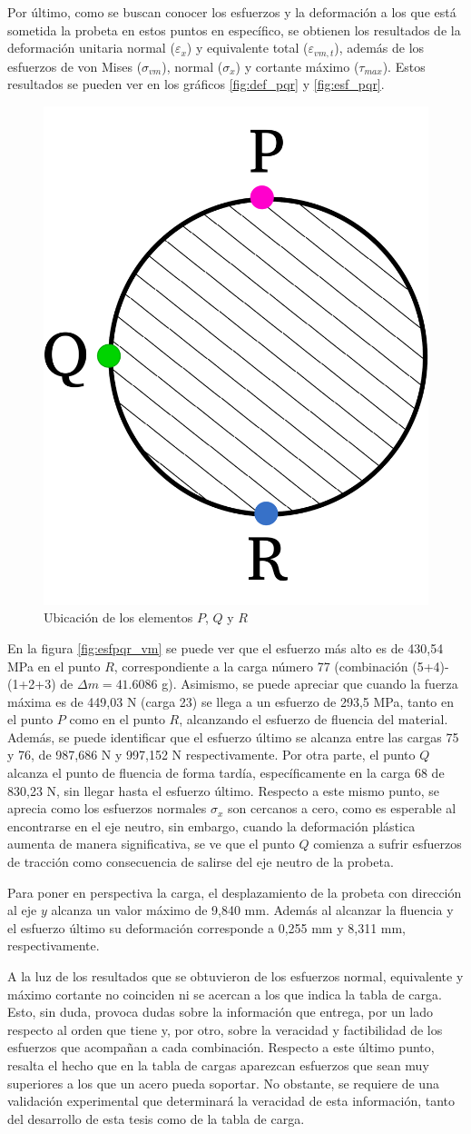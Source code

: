 \newpage

Por último, como se buscan conocer los esfuerzos y la deformación a los que está sometida la probeta en estos puntos en específico, se obtienen los resultados de la deformación unitaria normal ($\varepsilon_x$) y equivalente total ($\varepsilon_{vm,t}$), además de los esfuerzos de von Mises ($\sigma_{vm}$), normal ($\sigma_x$) y cortante máximo ($\tau_{max}$). Estos resultados se pueden ver en los gráficos \ref{fig:def_pqr} y \ref{fig:esf_pqr}.

\begin{figure}[h]
\centering
\includegraphics[width=0.2\linewidth]{Imagenes/diagelem_pqr.pdf}
\caption{Ubicación de los elementos $P$, $Q$ y $R$}
\label{fig:diag_pqr2}
\end{figure}

En la figura \ref{fig:esfpqr_vm} se puede ver que el esfuerzo más alto es de 430,54 MPa en el punto $R$, correspondiente a la carga número 77 (combinación (5+4)-(1+2+3) de $\Delta m = 41.6086$ g). Asimismo, se puede apreciar que cuando la fuerza máxima es de 449,03 N (carga 23) se llega a un esfuerzo de 293,5 MPa, tanto en el punto $P$ como en el punto $R$, alcanzando el esfuerzo de fluencia del material. Además, se puede identificar que el esfuerzo último se alcanza entre las cargas 75 y 76, de 987,686 N y 997,152 N respectivamente. Por otra parte, el punto $Q$ alcanza el punto de fluencia de forma tardía, específicamente en la carga 68 de 830,23 N, sin llegar hasta el esfuerzo último. Respecto a este mismo punto, se aprecia como los esfuerzos normales $\sigma_x$ son cercanos a cero, como es esperable al encontrarse en el eje neutro, sin embargo, cuando la deformación plástica aumenta de manera significativa, se ve que el punto $Q$ comienza a sufrir esfuerzos de tracción como consecuencia de salirse del eje neutro de la probeta. 

Para poner en perspectiva la carga, el desplazamiento de la probeta con dirección al eje $y$ alcanza un valor máximo de 9,840 mm. Además al alcanzar la fluencia y el esfuerzo último su deformación corresponde a 0,255 mm y 8,311 mm, respectivamente. 

A la luz de los resultados que se obtuvieron de los esfuerzos normal, equivalente y máximo cortante no coinciden ni se acercan a los que indica la tabla de carga. Esto, sin duda, provoca dudas sobre la información que entrega, por un lado respecto al orden que tiene y, por otro, sobre la veracidad y factibilidad de los esfuerzos que acompañan a cada combinación. Respecto a este último punto, resalta el hecho que en la tabla de cargas aparezcan esfuerzos que sean muy superiores a los que un acero pueda soportar. No obstante, se requiere de una validación experimental que determinará la veracidad de esta información, tanto del desarrollo de esta tesis como de la tabla de carga.  

